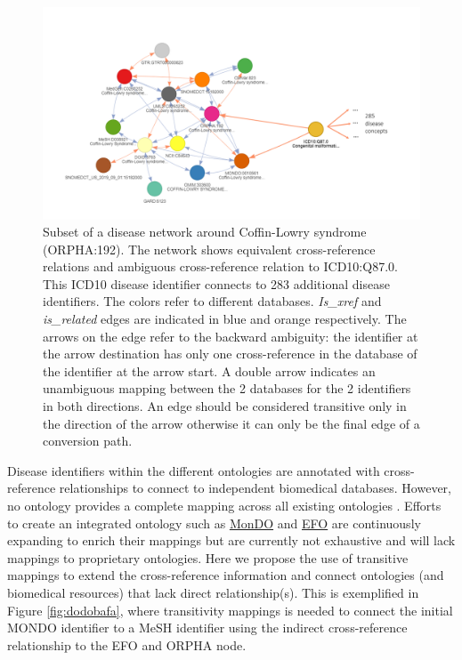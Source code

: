 \documentclass[9pt,a4paper,]{extarticle}
\begin{document}
\begin{figure}

{\centering \includegraphics[width=1\linewidth]{DODO-F1000-publication_files/figure-latex/Figure4} 

}

\caption{Subset of a disease network around Coffin-Lowry syndrome (ORPHA:192). The network shows equivalent cross-reference relations and ambiguous cross-reference relation to ICD10:Q87.0. This ICD10 disease identifier connects to 283 additional disease identifiers. The colors refer to different databases. \emph{Is\_xref} and \emph{is\_related} edges are indicated in blue and orange respectively. The arrows on the edge refer to the backward ambiguity: the identifier at the arrow destination has only one cross-reference in the database of the identifier at the arrow start. A double arrow indicates an unambiguous mapping between the 2 databases for the 2 identifiers in both directions. An edge should be considered transitive only in the direction of the arrow otherwise it can only be the final edge of a conversion path.}\label{fig:ICD10q87}
\end{figure}

Disease identifiers within the different ontologies are annotated with cross-reference relationships to connect to independent biomedical databases. However, no ontology provides a complete mapping across all existing ontologies \citep{Hu2017, Rappaport2013}. Efforts to create an integrated ontology such as \href{https://mondo.monarchinitiative.org/}{MonDO} and \href{http://blog.opentargets.org/2019/12/19/efo3-a-community-driven-ontology-to-advance-clinical-discoveries/}{EFO} are continuously expanding to enrich their mappings but are currently not exhaustive and will lack mappings to proprietary ontologies. Here we propose the use of transitive mappings to extend the cross-reference information and connect ontologies (and biomedical resources) that lack direct relationship(s). This is exemplified in Figure \ref{fig:dodobafa}, where transitivity mappings is needed to connect the initial MONDO identifier to a MeSH identifier using the indirect cross-reference relationship to the EFO and ORPHA node.
\end{document}
